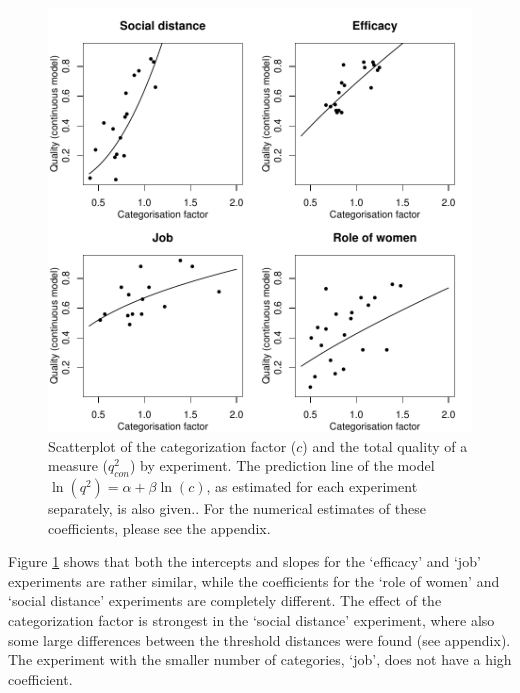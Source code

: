 \documentclass[a4paper,12pt]{article}
\begin{document}
\begin{figure}[bth] \centering \includegraphics[width=.7\textwidth]{i/predict_q2.pdf} \caption{Scatterplot of the categorization factor ($c$) and the total quality of a measure ($q^2_{con}$) by experiment. The prediction line of the model $\ln(q^2) = \alpha + \beta \ln(c)$, as estimated for each experiment separately, is also given.\label{fig:predict}. For the numerical estimates of these coefficients, please see the appendix.} \end{figure}

Figure \ref{fig:predict} shows that both the intercepts and slopes for the `efficacy' and `job' experiments are rather similar, while the coefficients for the `role of women' and `social distance' experiments are completely different. The effect of the categorization factor is strongest in the `social distance' experiment, where also some large differences between the threshold distances were found (see appendix). The experiment with the smaller number of categories, `job', does not have a high coefficient.

\end{document}
